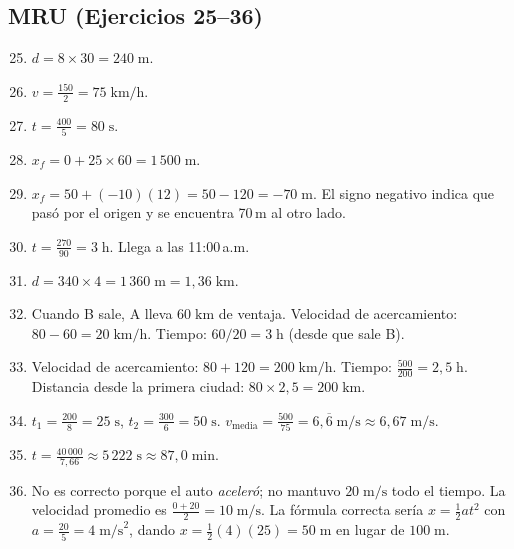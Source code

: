 \documentclass[12pt, letterpaper]{article}
\begin{document}
  \subsection*{MRU (Ejercicios 25--36)}

  \begin{enumerate}[leftmargin=*, label=\textbf{\arabic*.}]
    \setcounter{enumi}{24}
    \item $d = 8 \times 30 = 240\;\text{m}$.

    \item $v = \frac{150}{2} = 75\;\text{km/h}$.

    \item $t = \frac{400}{5} = 80\;\text{s}$.

    \item $x_f = 0 + 25 \times 60 = 1\,500\;\text{m}$.

    \item $x_f = 50 + (-10)(12) = 50 - 120 = -70\;\text{m}$. El signo negativo indica que pasó por el origen y se encuentra 70\,m al otro lado.

    \item $t = \frac{270}{90} = 3\;\text{h}$. Llega a las 11:00\,a.m.

    \item $d = 340 \times 4 = 1\,360\;\text{m} = 1{,}36\;\text{km}$.

    \item Cuando B sale, A lleva $60\;\text{km}$ de ventaja. Velocidad de acercamiento: $80 - 60 = 20\;\text{km/h}$. Tiempo: $60/20 = 3\;\text{h}$ (desde que sale B).

    \item Velocidad de acercamiento: $80 + 120 = 200\;\text{km/h}$. Tiempo: $\frac{500}{200} = 2{,}5\;\text{h}$. Distancia desde la primera ciudad: $80 \times 2{,}5 = 200\;\text{km}$.

    \item $t_1 = \frac{200}{8} = 25\;\text{s}$, $t_2 = \frac{300}{6} = 50\;\text{s}$. $v_{\text{media}} = \frac{500}{75} = 6{,}\overline{6}\;\text{m/s} \approx 6{,}67\;\text{m/s}$.

    \item $t = \frac{40\,000}{7{,}66} \approx 5\,222\;\text{s} \approx 87{,}0\;\text{min}$.

    \item No es correcto porque el auto \emph{aceleró}; no mantuvo $20\;\text{m/s}$ todo el tiempo. La velocidad promedio es $\frac{0 + 20}{2} = 10\;\text{m/s}$. La fórmula correcta sería $x = \frac{1}{2}at^2$ con $a = \frac{20}{5} = 4\;\text{m/s}^2$, dando $x = \frac{1}{2}(4)(25) = 50\;\text{m}$ en lugar de $100\;\text{m}$.
  \end{enumerate}
\end{document}
